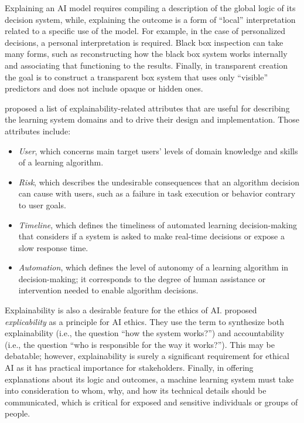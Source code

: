 Explaining an AI model requires compiling a description of the global logic of its decision system, while, explaining the outcome is a form of ``local'' interpretation related to a specific use of the model. For example, in the case of personalized \hbox{decisions,} a personal interpretation is required. Black box inspection can take many forms, such as reconstructing how the black box system works internally and associating that functioning to the results. Finally, in transparent creation the goal is to construct a transparent box system that uses only ``visible'' predictors and does not include opaque or hidden ones.

\citet{chap:10:JovanovicandSchmitz:2022} proposed a list of explainability-related attributes that are useful for describing the learning system domains and to drive their design and implementation. Those attributes include:

\begin{itemize}
\item \textit{User}, which concerns main target users' levels of domain knowledge and skills of a learning algorithm.

\item \textit{Risk}, which describes the undesirable consequences that an algorithm decision can cause with users, such as a failure in task execution or behavior contrary to user goals.

\item \textit{Timeline}, which defines the timeliness of automated learning decision-making that considers if a system is asked to make real-time decisions or expose a slow response time.

\item \textit{Automation}, which defines the level of autonomy of a learning algorithm in decision-making; it corresponds to the degree of human assistance or intervention needed to enable algorithm decisions.
\end{itemize}

Explainability is also a desirable feature for the ethics of AI. \citet{chap:10:Floridietal:2018} proposed \textit{explicability} as a principle for AI ethics. They use the term to synthesize both explainability (i.e., the question ``how the system works?'') and accountability (i.e., the question ``who is responsible for the way it works?''). This may be debatable; however, explainability is surely a significant requirement for ethical AI as it has practical importance for stakeholders. Finally, in offering explanations about its logic and outcomes, a machine learning system must take into consideration to whom, why, and how its technical details should be communicated, which is critical for exposed and sensitive individuals or groups of people.

